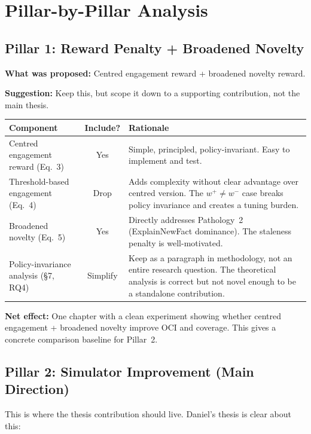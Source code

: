 \documentclass[11pt,a4paper]{article}
\begin{document}
\section{Pillar-by-Pillar Analysis}

\subsection{Pillar 1: Reward Penalty + Broadened Novelty}

\textbf{What was proposed:} Centred engagement reward + broadened novelty reward.

\textbf{Suggestion:} Keep this, but scope it down to a supporting contribution, not the main thesis.

\begin{table}[h]
\centering
\begin{tabularx}{\textwidth}{l c X}
\toprule
\textbf{Component} & \textbf{Include?} & \textbf{Rationale} \\
\midrule
Centred engagement reward (Eq.~3) & Yes & Simple, principled, policy-invariant. Easy to implement and test. \\
\addlinespace
Threshold-based engagement (Eq.~4) & Drop & Adds complexity without clear advantage over centred version. The $w^+ \neq w^-$ case breaks policy invariance and creates a tuning burden. \\
\addlinespace
Broadened novelty (Eq.~5) & Yes & Directly addresses Pathology~2 (ExplainNewFact dominance). The staleness penalty is well-motivated. \\
\addlinespace
Policy-invariance analysis (\S7, RQ4) & Simplify & Keep as a paragraph in methodology, not an entire research question. The theoretical analysis is correct but not novel enough to be a standalone contribution. \\
\bottomrule
\end{tabularx}
\end{table}

\textbf{Net effect:} One chapter with a clean experiment showing whether centred engagement + broadened novelty improve OCI and coverage. This gives a concrete comparison baseline for Pillar~2.


\subsection{Pillar 2: Simulator Improvement (Main Direction)}

This is where the thesis contribution should live. Daniel's thesis is clear about this:
\end{document}
